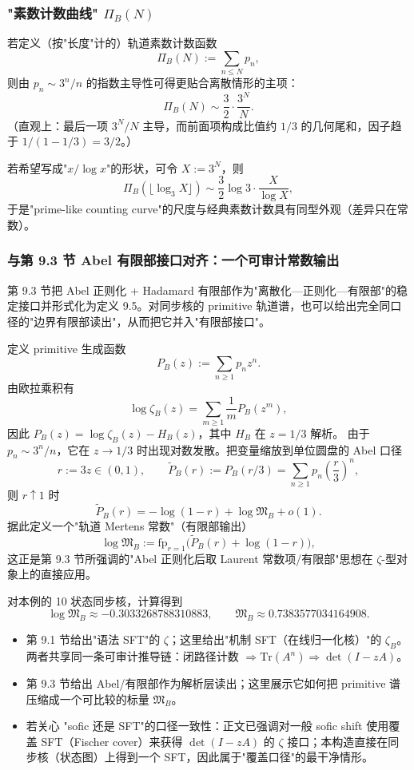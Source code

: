\subsubsection{"素数计数曲线" \texorpdfstring{$\Pi_B(N)$}{Pi\_B(N)}}
若定义（按"长度"计的）轨道素数计数函数
\[
\Pi_B(N):=\sum_{n\le N}p_n,
\]
则由 $p_n\sim 3^n/n$ 的指数主导性可得更贴合离散情形的主项：
\[
\Pi_B(N)\sim \frac{3}{2}\cdot \frac{3^N}{N}.
\]
（直观上：最后一项 $3^N/N$ 主导，而前面项构成比值约 $1/3$ 的几何尾和，因子趋于 $1/(1-1/3)=3/2$。）

若希望写成"$x/\log x$"的形状，可令 $X:=3^N$，则
\[
\Pi_B(\lfloor \log_3 X\rfloor)\sim \frac{3}{2}\log 3\cdot \frac{X}{\log X},
\]
于是"prime-like counting curve"的尺度与经典素数计数具有同型外观（差异只在常数）。

\subsubsection{与第 9.3 节 Abel 有限部接口对齐：一个可审计常数输出}
第 9.3 节把 Abel 正则化 + Hadamard 有限部作为"离散化—正则化—有限部"的稳定接口并形式化为定义 9.5。对同步核的 primitive 轨道谱，也可以给出完全同口径的"边界有限部读出"，从而把它并入"有限部接口"。

定义 primitive 生成函数
\[
P_B(z):=\sum_{n\ge 1}p_n z^n.
\]
由欧拉乘积有
\[
\log\zeta_B(z)=\sum_{m\ge 1}\frac{1}{m}P_B(z^m),
\]
因此 $P_B(z)=\log\zeta_B(z)-H_B(z)$，其中 $H_B$ 在 $z=1/3$ 解析。
由于 $p_n\sim 3^n/n$，它在 $z\to 1/3$ 时出现对数发散。把变量缩放到单位圆盘的 Abel 口径
\[
r:=3z\in(0,1),\qquad
\widetilde P_B(r):=P_B(r/3)=\sum_{n\ge 1}p_n\left(\frac{r}{3}\right)^n,
\]
则 $r\uparrow 1$ 时
\[
\widetilde P_B(r)= -\log(1-r)+\log\mathfrak{M}_B+o(1).
\]
据此定义一个"轨道 Mertens 常数"（有限部输出）
\[
\log\mathfrak{M}_B
:=\mathrm{fp}_{r=1}\bigl(\widetilde P_B(r)+\log(1-r)\bigr),
\]
这正是第 9.3 节所强调的"Abel 正则化后取 Laurent 常数项/有限部"思想在 $\zeta$-型对象上的直接应用。

对本例的 10 状态同步核，计算得到
\[
\log \mathfrak{M}_B\approx -0.3033268788310883,
\qquad
\mathfrak{M}_B\approx 0.7383577034164908.
\]

\begin{remark}[与第 9 节的接口说明]
\begin{itemize}
  \item 第 9.1 节给出"语法 SFT"的 $\zeta$；这里给出"机制 SFT（在线归一化核）"的 $\zeta_B$。两者共享同一条可审计推导链：闭路径计数 $\Rightarrow \mathrm{Tr}(A^n) \Rightarrow \det(I-zA)$。
  \item 第 9.3 节给出 Abel/有限部作为解析层读出；这里展示它如何把 primitive 谱压缩成一个可比较的标量 $\mathfrak{M}_B$。
  \item 若关心 "sofic 还是 SFT"的口径一致性：正文已强调对一般 sofic shift 使用覆盖 SFT（Fischer cover）来获得 $\det(I-zA)$ 的 $\zeta$ 接口；本构造直接在同步核（状态图）上得到一个 SFT，因此属于"覆盖口径"的最干净情形。
\end{itemize}
\end{remark}

